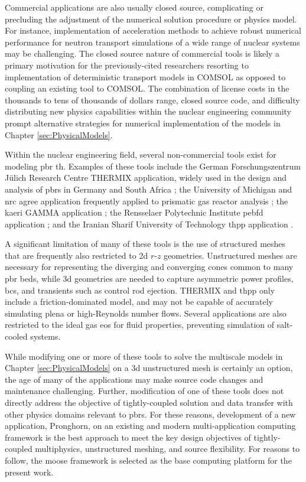 Commercial applications are also usually closed source, complicating or precluding the adjustment of the numerical solution procedure or physics model. For instance, implementation of acceleration methods to achieve robust numerical performance for neutron transport simulations of a wide range of nuclear systems \cite{willert} may be challenging. The closed source nature of commercial tools is likely a primary motivation for the previously-cited researchers resorting to implementation of deterministic transport models in COMSOL as opposed to coupling an existing tool to COMSOL. The combination of license costs in the thousands to tens of thousands of dollars range, closed source code, and difficulty distributing new physics capabilities within the nuclear engineering community prompt alternative strategies for numerical implementation of the models in Chapter \ref{sec:PhysicalModels}.

Within the nuclear engineering field, several non-commercial tools exist for modeling \gls{pbr} \gls{th}. Examples of these tools include the German Forschungszentrum J{\"u}lich Research Centre THERMIX application, widely used in the design and analysis of \glspl{pbr} in Germany and South Africa \cite{gao,tecdoc1163,THERMIX, zwaan}; the University of Michigan and \gls{nrc} \gls{agree} application frequently applied to prismatic gas reactor analysis \cite{seker}; the \gls{kaeri} GAMMA application \cite{lim}; the Rensselaer Polytechnic Institute \gls{pebfd} application \cite{y_li}; and the Iranian Sharif University of Technology \gls{thpp} application \cite{nouri}.

A significant limitation of many of these tools is the use of structured meshes that are frequently also restricted to \gls{2d} $r$-$z$ geometries. Unstructured meshes are necessary for representing the diverging and converging cones common to many \gls{pbr} beds, while \gls{3d} geometries are needed to capture asymmetric power profiles, \glspl{bc}, and transients such as control rod ejection. THERMIX and \gls{thpp} only include a friction-dominated model, and may not be capable of accurately simulating plena or high-Reynolds number flows. Several applications are also restricted to the ideal gas \gls{eos} for fluid properties, preventing simulation of salt-cooled systems. 

While modifying one or more of these tools to solve the multiscale models in Chapter \ref{sec:PhysicalModels} on a \gls{3d} unstructured mesh is certainly an option, the age of many of the applications may make source code changes and maintenance challenging. Further, modification of one of these tools does not directly address the objective of tightly-coupled solution and data transfer with other physics domains relevant to \glspl{pbr}. For these reasons, development of a new application, Pronghorn, on an existing and modern multi-application computing framework is the best approach to meet the key design objectives of tightly-coupled multiphysics, unstructured meshing, and source flexibility. For reasons to follow, the \gls{moose} framework is selected as the base computing platform for the present work.

